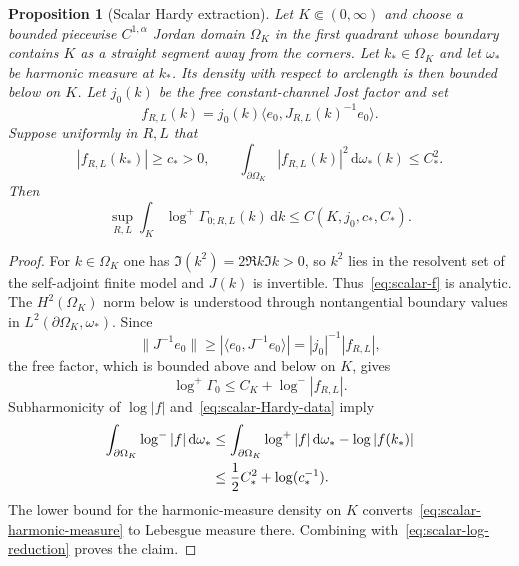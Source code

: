 \documentclass[11pt]{article}
\newcommand{\dd}{\,\mathrm d}
\newtheorem{proposition}[theorem]{Proposition}
\theoremstyle{definition}
\theoremstyle{remark}
\begin{document}
\begin{proposition}[Scalar Hardy extraction]\label{prop:scalar-hardy-extraction}
Let $K\Subset(0,\infty)$ and choose a bounded piecewise $C^{1,\alpha}$ Jordan domain $\Omega_K$ in the first quadrant whose boundary contains $K$ as a straight segment away from the corners.  Let $k_*\in\Omega_K$ and let $\omega_*$ be harmonic measure at $k_*$.  Its density with respect to arclength is then bounded below on $K$.  Let $j_0(k)$ be the free constant-channel Jost factor and set
\begin{equation}
 f_{R,L}(k)=j_0(k)\langle e_0,J_{R,L}(k)^{-1}e_0\rangle.
 \label{eq:scalar-f}
\end{equation}
Suppose uniformly in $R,L$ that
\begin{equation}
 |f_{R,L}(k_*)|\geq c_*>0,
 \qquad
 \int_{\partial\Omega_K}|f_{R,L}(k)|^2\dd\omega_*(k)
 \leq C_*^2.
 \label{eq:scalar-Hardy-data}
\end{equation}
Then
\begin{equation}
 \sup_{R,L}\int_K\log^+\Gamma_{0;R,L}(k)\dd k
 \leq C(K,j_0,c_*,C_*).
 \label{eq:scalar-Hardy-conclusion}
\end{equation}
\end{proposition}

\begin{proof}
For $k\in\Omega_K$ one has $\Im(k^2)=2\Re k\Im k>0$, so $k^2$ lies in the resolvent set of the self-adjoint finite model and $J(k)$ is invertible.  Thus~\eqref{eq:scalar-f} is analytic.  The $H^2(\Omega_K)$ norm below is understood through nontangential boundary values in $L^2(\partial\Omega_K,\omega_*)$.  Since
\begin{equation}
 \|J^{-1}e_0\|
 \geq|\langle e_0,J^{-1}e_0\rangle|
 =|j_0|^{-1}|f_{R,L}|,
\end{equation}
the free factor, which is bounded above and below on $K$, gives
\begin{equation}
 \log^+\Gamma_0
 \leq C_K+\log^-|f_{R,L}|.
 \label{eq:scalar-log-reduction}
\end{equation}
Subharmonicity of $\log|f|$ and~\eqref{eq:scalar-Hardy-data} imply
\begin{align}
 \int_{\partial\Omega_K}\log^-|f|\dd\omega_*
 &\leq
 \int_{\partial\Omega_K}\log^+|f|\dd\omega_*
 -\log|f(k_*)|\notag\\
 &\leq \frac12C_*^2+\log(c_*^{-1}).
 \label{eq:scalar-harmonic-measure}
\end{align}
The lower bound for the harmonic-measure density on $K$ converts~\eqref{eq:scalar-harmonic-measure} to Lebesgue measure there.  Combining with~\eqref{eq:scalar-log-reduction} proves the claim.
\end{proof}
\end{document}
